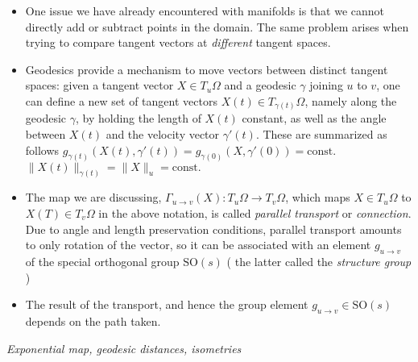 \documentclass[12pt]{article}
\numberwithin{equation}{section}
\theoremstyle{definition}
\newcommand{		\SO		}	{	\textrm{SO}				}
\newcommand{		\n		}	{	\noindent					} %
\newcommand{		\Oh		}	{	\Omega					}
\newcommand{		\1		}	{	\bm{1}					}%
\begin{document}
\begin{itemize}

\item One issue we have already encountered with manifolds is that we cannot directly add or subtract points in the domain. The same problem arises when trying to compare tangent vectors at \emph{different} tangent spaces.

\item Geodesics provide a mechanism to move vectors between distinct tangent spaces: given a tangent vector $X \in T_u\Oh$ and a geodesic $\gamma$ joining $u$ to $v$, one can define a new set of tangent vectors $X(t) \in T_{\gamma(t)}\Oh$, namely along the geodesic $\gamma$, by holding the length of $X(t)$ constant, as well as the angle between $X(t)$ and the velocity vector $\gamma'(t)$. These are summarized as follows
\subitem $g_{\gamma(t)} (X(t), \gamma'(t) ) = g_{\gamma(0)} (X, \gamma'(0)) = \textrm{const.}$
\subitem $\| X(t) \|_{\gamma(t)} = \| X \|_u = \textrm{const.}$

\item The map we are discussing, $\Gamma_{u \to v} (X) : T_u \Oh \to T_v\Oh$, which maps $X \in T_u \Oh$ to $X(T) \in T_v \Oh$ in the above notation, is called \emph{parallel transport} or \emph{connection}. Due to angle and length preservation conditions, parallel transport amounts to only rotation of the vector, so it can be associated with an element $g_{u \to v}$ of the special orthogonal group $\SO(s)$ ( the latter called the \emph{structure group} )

\item The result of the transport, and hence the group element $g_{u \to v} \in \SO(s)$ depends on the path taken. 

\end{itemize}

\n\hrulefill 
\emph{ Exponential map, geodesic distances, isometries }
\hrulefill
\end{document}

